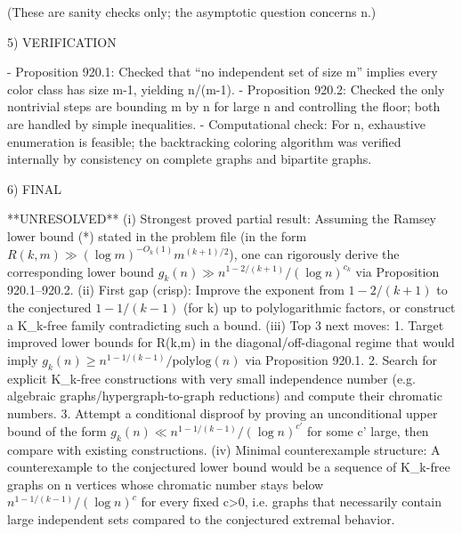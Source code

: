 (These are sanity checks only; the asymptotic question concerns n\to\infty.)


5) VERIFICATION

- Proposition 920.1: Checked that “no independent set of size m” implies every color class has size \le m-1, yielding \chi\ge n/(m-1).
- Proposition 920.2: Checked the only nontrivial steps are bounding \log m by \log n for large n and controlling the floor; both are handled by simple inequalities.
- Computational check: For n, exhaustive enumeration is feasible; the backtracking coloring algorithm was verified internally by consistency on complete graphs and bipartite graphs.


6) FINAL

**UNRESOLVED**
(i) Strongest proved partial result: Assuming the Ramsey lower bound (*) stated in the problem file (in the form \(R(k,m)\gg (\log m)^{-O_k(1)} m^{(k+1)/2}\)), one can rigorously derive the corresponding lower bound \(g_k(n)\gg n^{1-2/(k+1)}/(\log n)^{c_k}\) via Proposition 920.1–920.2.
(ii) First gap (crisp): Improve the exponent from \(1-2/(k+1)\) to the conjectured \(1-1/(k-1)\) (for k) up to polylogarithmic factors, or construct a K_k-free family contradicting such a bound.
(iii) Top 3 next moves:
  1. Target improved lower bounds for R(k,m) in the diagonal/off-diagonal regime that would imply \(g_k(n)\ge n^{1-1/(k-1)}/\mathrm{polylog}(n)\) via Proposition 920.1.
  2. Search for explicit K_k-free constructions with very small independence number (e.g. algebraic graphs/hypergraph-to-graph reductions) and compute their chromatic numbers.
  3. Attempt a conditional disproof by proving an unconditional upper bound of the form \(g_k(n)\ll n^{1-1/(k-1)}/(\log n)^{c'}\) for some c' large, then compare with existing constructions.
(iv) Minimal counterexample structure: A counterexample to the conjectured lower bound would be a sequence of K_k-free graphs on n vertices whose chromatic number stays below \(n^{1-1/(k-1)}/(\log n)^c\) for every fixed c>0, i.e. graphs that necessarily contain large independent sets compared to the conjectured extremal behavior.


